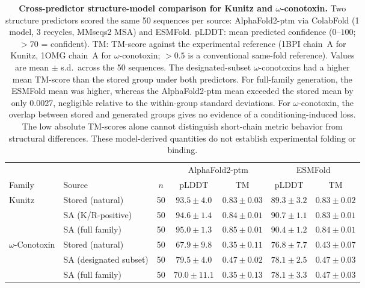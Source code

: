 {\begin{table}[htbp]
  \centering
  \caption{\textbf{Cross-predictor structure-model comparison for Kunitz and
  $\omega$-conotoxin.}
  Two structure predictors scored the same 50 sequences per source:
  AlphaFold2-ptm via ColabFold (1 model, 3 recycles, MMseqs2 MSA) and ESMFold.
  pLDDT: mean predicted confidence ($0$--$100$; $>70$ = confident).
  TM: TM-score against the experimental reference (1BPI chain~A for Kunitz,
  1OMG chain~A for $\omega$-conotoxin; $>0.5$ is a conventional same-fold reference).
  Values are mean $\pm$ s.d.\ across the 50 sequences.
  The designated-subset $\omega$-conotoxins had a higher mean TM-score than the stored group
  under both predictors. For full-family generation, the ESMFold mean was higher, whereas the
  AlphaFold2-ptm mean exceeded the stored mean by only 0.0027, negligible relative to the
  within-group standard deviations. For $\omega$-conotoxin, the overlap between stored
  and generated groups gives no evidence of a conditioning-induced loss. The low absolute
  TM-scores alone cannot distinguish short-chain metric behavior from structural
  differences. These model-derived quantities do not establish experimental folding or
  binding.}
  \label{tab:structure-model-comparison}
  \small
  \begin{tabular}{llccccc}
    \toprule
    & & & \multicolumn{2}{c}{AlphaFold2-ptm} & \multicolumn{2}{c}{ESMFold} \\
    \cmidrule(lr){4-5}\cmidrule(lr){6-7}
    Family & Source & $n$ & pLDDT & TM & pLDDT & TM \\
    \midrule
    \multirow{3}{*}{Kunitz}
      & Stored (natural)       & 50 & $93.5 \pm 4.0$  & $0.83 \pm 0.03$ & $89.3 \pm 3.2$ & $0.83 \pm 0.02$ \\
      & SA (K/R-positive)      & 50 & $94.6 \pm 1.4$  & $0.84 \pm 0.01$ & $90.7 \pm 1.1$ & $0.83 \pm 0.01$ \\
      & SA (full family)       & 50 & $95.0 \pm 1.3$  & $0.85 \pm 0.01$ & $90.4 \pm 1.2$ & $0.84 \pm 0.01$ \\
    \midrule
    \multirow{3}{*}{$\omega$-Conotoxin}
      & Stored (natural)       & 50 & $67.9 \pm 9.8$  & $0.35 \pm 0.11$ & $76.8 \pm 7.7$ & $0.43 \pm 0.07$ \\
      & SA (designated subset) & 50 & $79.5 \pm 4.0$  & $0.47 \pm 0.02$ & $78.1 \pm 2.5$ & $0.47 \pm 0.03$ \\
      & SA (full family)       & 50 & $70.0 \pm 11.1$ & $0.35 \pm 0.13$ & $78.1 \pm 3.3$ & $0.47 \pm 0.03$ \\
    \bottomrule
  \end{tabular}
\end{table}
\FloatBarrier
}
